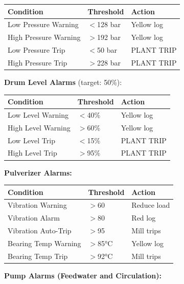 \documentclass[10pt,a5paper]{article}
\begin{document}
\begin{center}
\begin{tabular}{lll}
\toprule
\textbf{Condition} & \textbf{Threshold} & \textbf{Action} \\
\midrule
Low Pressure Warning  & $<$128 bar & Yellow log   \\
High Pressure Warning & $>$192 bar & Yellow log   \\
Low Pressure Trip     & $<$50 bar  & PLANT TRIP   \\
High Pressure Trip    & $>$228 bar & PLANT TRIP   \\
\bottomrule
\end{tabular}
\end{center}

\textbf{Drum Level Alarms} (target: 50\%):

\begin{center}
\begin{tabular}{lll}
\toprule
\textbf{Condition} & \textbf{Threshold} & \textbf{Action} \\
\midrule
Low Level Warning  & $<$40\% & Yellow log \\
High Level Warning & $>$60\% & Yellow log \\
Low Level Trip     & $<$15\% & PLANT TRIP \\
High Level Trip    & $>$95\% & PLANT TRIP \\
\bottomrule
\end{tabular}
\end{center}

\textbf{Pulverizer Alarms:}

\begin{center}
\begin{tabular}{lll}
\toprule
\textbf{Condition} & \textbf{Threshold} & \textbf{Action} \\
\midrule
Vibration Warning       & $>$60   & Reduce load \\
Vibration Alarm         & $>$80   & Red log     \\
Vibration Auto-Trip     & $>$95   & Mill trips  \\
Bearing Temp Warning    & $>$85°C & Yellow log  \\
Bearing Temp Trip       & $>$92°C & Mill trips  \\
\bottomrule
\end{tabular}
\end{center}

\textbf{Pump Alarms (Feedwater and Circulation):}
\end{document}
